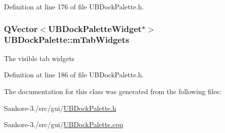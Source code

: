Definition at line 176 of file U\-B\-Dock\-Palette.\-h.

\hypertarget{class_u_b_dock_palette_a80ec644a3bc1740715ec00e4f26cab22}{
\subsubsection[{m\-Tab\-Widgets}]{\setlength{\rightskip}{0pt plus 5cm}Q\-Vector$<${\bf U\-B\-Dock\-Palette\-Widget}$\ast$$>$ U\-B\-Dock\-Palette\-::m\-Tab\-Widgets\hspace{0.3cm}{\ttfamily [protected]}}}\label{dc/d54/class_u_b_dock_palette_a80ec644a3bc1740715ec00e4f26cab22}
The visible tab widgets 

Definition at line 186 of file U\-B\-Dock\-Palette.\-h.



The documentation for this class was generated from the following files\-:\begin{DoxyCompactItemize}
\item 
Sankore-\/3./src/gui/\hyperlink{_u_b_dock_palette_8h}{U\-B\-Dock\-Palette.\-h}\item 
Sankore-\/3./src/gui/\hyperlink{_u_b_dock_palette_8cpp}{U\-B\-Dock\-Palette.\-cpp}\end{DoxyCompactItemize}
